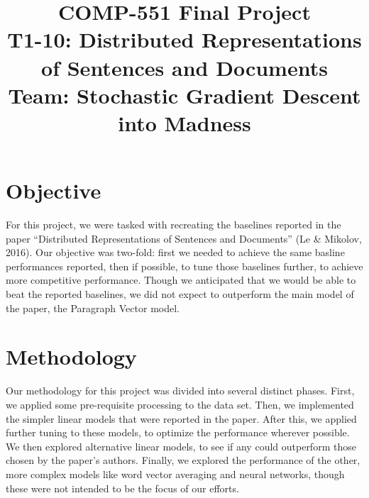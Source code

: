 \documentclass[conference]{IEEEtran}
\begin{document}
\title{COMP-551 Final Project\\
{\LARGE T1-10: Distributed Representations of Sentences and Documents}\\
{\Large Team: Stochastic Gradient Descent into Madness}
}

\author{
\and
{}
\and
{}
}

\maketitle

\section{Objective}

For this project, we were tasked with recreating the baselines reported in the paper ``Distributed Representations of Sentences and Documents'' (Le \& Mikolov, 2016). Our objective was two-fold: first we needed to achieve the same basline performances reported, then if possible, to tune those baselines further, to achieve more competitive performance. Though we anticipated that we would be able to beat the reported baselines, we did not expect to outperform the main model of the paper, the Paragraph Vector model.


\section{Methodology}

Our methodology for this project was divided into several distinct phases. First, we applied some pre-requisite processing to the data set. Then, we implemented the simpler linear models that were reported in the paper. After this, we applied further tuning to these models, to optimize the performance wherever possible. We then explored alternative linear models, to see if any could outperform those chosen by the paper's authors. Finally, we explored the performance of the other, more complex models like word vector averaging and neural networks, though these were not intended to be the focus of our efforts.
\end{document}
